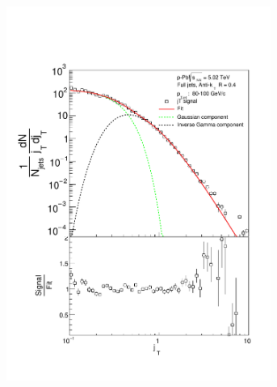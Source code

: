 \begin{appendices}
\begin{figure}
\begin{subfigure}{0.24\textwidth}
\includegraphics[width=0.95\textwidth]{results/JetConejTSignalFit/JetConejTSignalFitNFin00JetPt06perconeBgBayes}
\end{subfigure}
\begin{subfigure}{0.24\textwidth}

\end{subfigure}
\end{figure}
\end{appendices}
